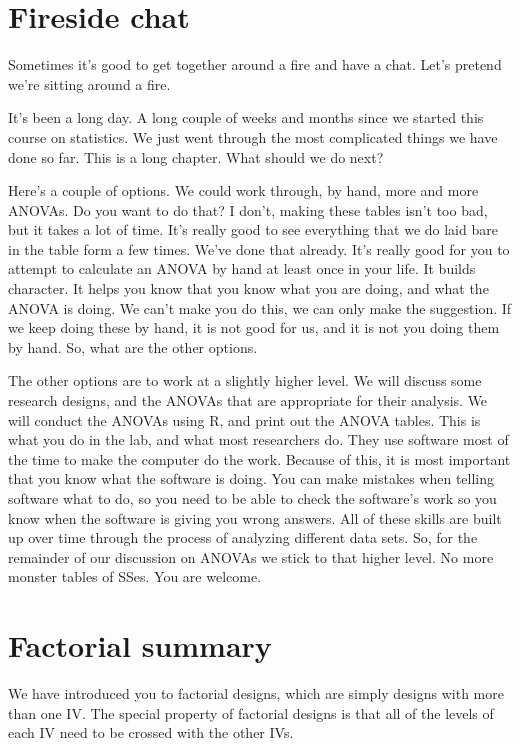 \documentclass[
  letterpaper,
  DIV=11,
  numbers=noendperiod]{scrreprt}
\begin{document}
\section{Fireside chat}\label{fireside-chat}

Sometimes it's good to get together around a fire and have a chat. Let's
pretend we're sitting around a fire.

It's been a long day. A long couple of weeks and months since we started
this course on statistics. We just went through the most complicated
things we have done so far. This is a long chapter. What should we do
next?

Here's a couple of options. We could work through, by hand, more and
more ANOVAs. Do you want to do that? I don't, making these tables isn't
too bad, but it takes a lot of time. It's really good to see everything
that we do laid bare in the table form a few times. We've done that
already. It's really good for you to attempt to calculate an ANOVA by
hand at least once in your life. It builds character. It helps you know
that you know what you are doing, and what the ANOVA is doing. We can't
make you do this, we can only make the suggestion. If we keep doing
these by hand, it is not good for us, and it is not you doing them by
hand. So, what are the other options.

The other options are to work at a slightly higher level. We will
discuss some research designs, and the ANOVAs that are appropriate for
their analysis. We will conduct the ANOVAs using R, and print out the
ANOVA tables. This is what you do in the lab, and what most researchers
do. They use software most of the time to make the computer do the work.
Because of this, it is most important that you know what the software is
doing. You can make mistakes when telling software what to do, so you
need to be able to check the software's work so you know when the
software is giving you wrong answers. All of these skills are built up
over time through the process of analyzing different data sets. So, for
the remainder of our discussion on ANOVAs we stick to that higher level.
No more monster tables of SSes. You are welcome.

\section{Factorial summary}\label{factorial-summary}

We have introduced you to factorial designs, which are simply designs
with more than one IV. The special property of factorial designs is that
all of the levels of each IV need to be crossed with the other IVs.
\end{document}
